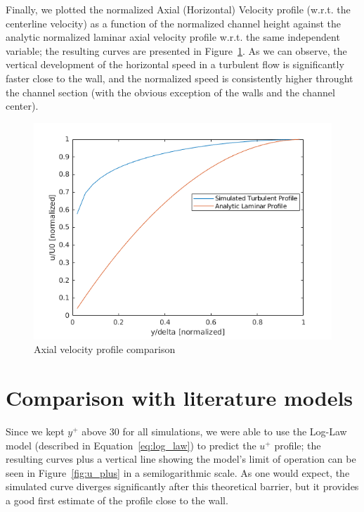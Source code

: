 \documentclass[12pt]{article}
\begin{document}
        Finally, we plotted the normalized Axial (Horizontal) Velocity profile (w.r.t. the centerline velocity) as a function of the normalized channel height against the analytic normalized laminar axial velocity profile w.r.t. the same independent variable; the resulting curves are presented in Figure~\ref{fig:axialV}. As we can observe, the vertical development of the horizontal speed in a turbulent flow is significantly faster close to the wall, and the normalized speed is consistently higher throught the channel section (with the obvious exception of the walls and the channel center).

        \begin{figure}
                \centering
                \includegraphics[width=\textwidth]{Axial_Velocities.png}
                \caption{Axial velocity profile comparison}
                \label{fig:axialV}
        \end{figure}

\section{Comparison with literature models} \label{sec:literature}

        Since we kept \( y^+ \) above 30 for all simulations, we were able to use the Log-Law model (described in Equation~\ref{eq:log_law}) to predict the \( u^+ \) profile; the resulting curves plus a vertical line showing the model's limit of operation can be seen in Figure~\ref{fig:u_plus} in a semilogarithmic scale. As one would expect, the simulated curve diverges significantly after this theoretical barrier, but it provides a good first estimate of the profile close to the wall.
\end{document}
